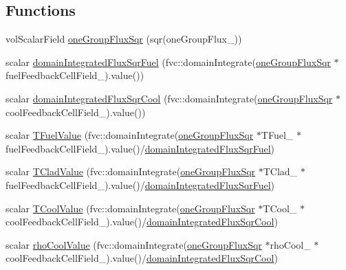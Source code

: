 \subsection*{Functions}
\begin{DoxyCompactItemize}
\item 
vol\+Scalar\+Field \hyperlink{computeFeedbackFieldValues_8H_a965ade2a15637edaf7126bb8e4c39330}{one\+Group\+Flux\+Sqr} (sqr(one\+Group\+Flux\+\_\+))
\item 
scalar \hyperlink{computeFeedbackFieldValues_8H_a8b30ce5e08b618230e12e55e87d8afce}{domain\+Integrated\+Flux\+Sqr\+Fuel} (fvc\+::domain\+Integrate(\hyperlink{computeFeedbackFieldValues_8H_a965ade2a15637edaf7126bb8e4c39330}{one\+Group\+Flux\+Sqr} $\ast$fuel\+Feedback\+Cell\+Field\+\_\+).value())
\item 
scalar \hyperlink{computeFeedbackFieldValues_8H_a1979050c3e525fccf63e4c49237c5823}{domain\+Integrated\+Flux\+Sqr\+Cool} (fvc\+::domain\+Integrate(\hyperlink{computeFeedbackFieldValues_8H_a965ade2a15637edaf7126bb8e4c39330}{one\+Group\+Flux\+Sqr} $\ast$cool\+Feedback\+Cell\+Field\+\_\+).value())
\item 
scalar \hyperlink{computeFeedbackFieldValues_8H_ac4077c55a765b52fa94f1ed80f0aa27f}{T\+Fuel\+Value} (fvc\+::domain\+Integrate(\hyperlink{computeFeedbackFieldValues_8H_a965ade2a15637edaf7126bb8e4c39330}{one\+Group\+Flux\+Sqr} $\ast$T\+Fuel\+\_\+ $\ast$fuel\+Feedback\+Cell\+Field\+\_\+).value()/\hyperlink{computeFeedbackFieldValues_8H_a8b30ce5e08b618230e12e55e87d8afce}{domain\+Integrated\+Flux\+Sqr\+Fuel})
\item 
scalar \hyperlink{computeFeedbackFieldValues_8H_a29801690652bbcb1415a8e90df6bc6fd}{T\+Clad\+Value} (fvc\+::domain\+Integrate(\hyperlink{computeFeedbackFieldValues_8H_a965ade2a15637edaf7126bb8e4c39330}{one\+Group\+Flux\+Sqr} $\ast$T\+Clad\+\_\+ $\ast$fuel\+Feedback\+Cell\+Field\+\_\+).value()/\hyperlink{computeFeedbackFieldValues_8H_a8b30ce5e08b618230e12e55e87d8afce}{domain\+Integrated\+Flux\+Sqr\+Fuel})
\item 
scalar \hyperlink{computeFeedbackFieldValues_8H_ad97890bb5f696e1ed4c20e854caf6e62}{T\+Cool\+Value} (fvc\+::domain\+Integrate(\hyperlink{computeFeedbackFieldValues_8H_a965ade2a15637edaf7126bb8e4c39330}{one\+Group\+Flux\+Sqr} $\ast$T\+Cool\+\_\+ $\ast$cool\+Feedback\+Cell\+Field\+\_\+).value()/\hyperlink{computeFeedbackFieldValues_8H_a1979050c3e525fccf63e4c49237c5823}{domain\+Integrated\+Flux\+Sqr\+Cool})
\item 
scalar \hyperlink{computeFeedbackFieldValues_8H_adfa280f8c80d99ac065a923d399c8324}{rho\+Cool\+Value} (fvc\+::domain\+Integrate(\hyperlink{computeFeedbackFieldValues_8H_a965ade2a15637edaf7126bb8e4c39330}{one\+Group\+Flux\+Sqr} $\ast$rho\+Cool\+\_\+ $\ast$cool\+Feedback\+Cell\+Field\+\_\+).value()/\hyperlink{computeFeedbackFieldValues_8H_a1979050c3e525fccf63e4c49237c5823}{domain\+Integrated\+Flux\+Sqr\+Cool})

\end{DoxyCompactItemize}
